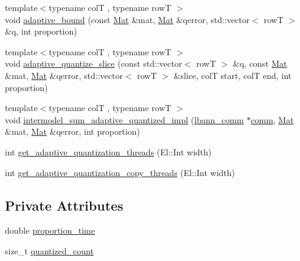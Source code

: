 \begin{DoxyCompactItemize}
\item 
{\footnotesize template$<$typename colT , typename rowT $>$ }\\void \hyperlink{classlbann_1_1lbann__quantizer_a9d6e80bd54d6eb03dc63c15861356557}{adaptive\+\_\+bound} (const \hyperlink{base_8hpp_a68f11fdc31b62516cb310831bbe54d73}{Mat} \&mat, \hyperlink{base_8hpp_a68f11fdc31b62516cb310831bbe54d73}{Mat} \&qerror, std\+::vector$<$ rowT $>$ \&q, int proportion)
\item 
{\footnotesize template$<$typename colT , typename rowT $>$ }\\void \hyperlink{classlbann_1_1lbann__quantizer_ab3a0e79b571e7c016446c179eedd0dc1}{adaptive\+\_\+quantize\+\_\+slice} (const std\+::vector$<$ rowT $>$ \&q, const \hyperlink{base_8hpp_a68f11fdc31b62516cb310831bbe54d73}{Mat} \&mat, \hyperlink{base_8hpp_a68f11fdc31b62516cb310831bbe54d73}{Mat} \&qerror, std\+::vector$<$ rowT $>$ \&slice, colT start, colT end, int proportion)
\item 
{\footnotesize template$<$typename colT , typename rowT $>$ }\\void \hyperlink{classlbann_1_1lbann__quantizer_a3fe3493cb16b85bd4eaf251980408f1b}{intermodel\+\_\+sum\+\_\+adaptive\+\_\+quantized\+\_\+impl} (\hyperlink{classlbann_1_1lbann__comm}{lbann\+\_\+comm} $\ast$\hyperlink{file__io_8cpp_ab048c6f9fcbcfaa57ce68b00263dbebe}{comm}, \hyperlink{base_8hpp_a68f11fdc31b62516cb310831bbe54d73}{Mat} \&mat, \hyperlink{base_8hpp_a68f11fdc31b62516cb310831bbe54d73}{Mat} \&qerror, int proportion)
\item 
int \hyperlink{classlbann_1_1lbann__quantizer_aaa0c20f755437130172c40ca8e95bc3f}{get\+\_\+adaptive\+\_\+quantization\+\_\+threads} (El\+::\+Int width)
\item 
int \hyperlink{classlbann_1_1lbann__quantizer_a22b898932caed41ccf24abcb67c00ba1}{get\+\_\+adaptive\+\_\+quantization\+\_\+copy\+\_\+threads} (El\+::\+Int width)
\end{DoxyCompactItemize}
\subsection*{Private Attributes}
\begin{DoxyCompactItemize}
\item 
double \hyperlink{classlbann_1_1lbann__quantizer_a6bd266728f578df0c86fc2e493742cc1}{proportion\+\_\+time}
\item 
size\+\_\+t \hyperlink{classlbann_1_1lbann__quantizer_a716fae78ef5ba082a8093f0d06550804}{quantized\+\_\+count}
\end{DoxyCompactItemize}
